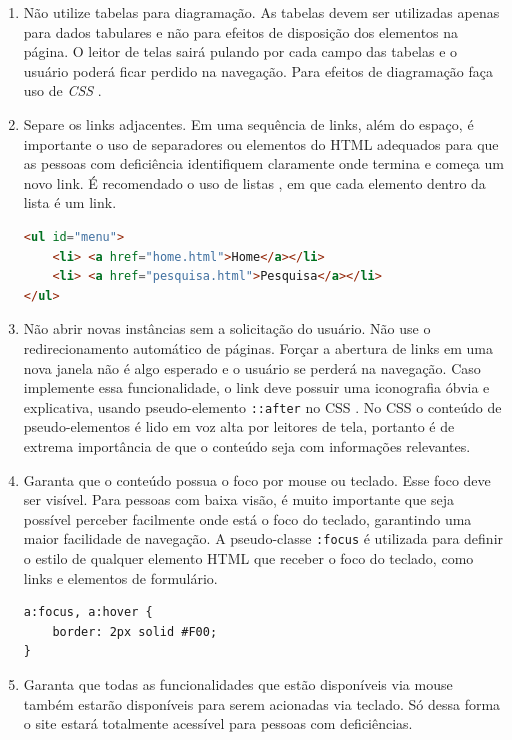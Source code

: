 {{{\begin{enumerate}
{\begin{lstlisting}[language=html,caption=usando landmarks]
<div role="heading" id="cabecalho"> 
  <h1>O Cabeçalho</h1> 
  <a href="#conteudo" accesskey="p">Pular para o conteúdo principals</a> 
</div> 
<div role="navigation" id="navegacao"> conteúdo da navegação </div>
<div role="main" id="conteudo"> conteúdo da main </mdiv>
\end{lstlisting}}
    \item Não utilize tabelas para diagramação. As tabelas devem ser utilizadas apenas para dados tabulares e não para efeitos de disposição dos elementos na página. O leitor de telas sairá pulando por cada campo das tabelas e o usuário poderá ficar perdido na navegação. Para efeitos de diagramação faça uso de \textit{CSS} \cite{CSS}.
    \item Separe os links adjacentes. Em uma sequência de links, além do espaço, é importante o uso de separadores ou elementos do HTML \cite{HTML} adequados para que as pessoas com deficiência identifiquem claramente onde termina e começa um novo link. É recomendado o uso de listas , em que cada elemento dentro da lista é um link.
{\begin{lstlisting}[language=html,caption=separando links adjacentes]
<ul id="menu">
    <li> <a href="home.html">Home</a></li>
    <li> <a href="pesquisa.html">Pesquisa</a></li>
</ul>
\end{lstlisting}}
    \item Não abrir novas instâncias sem a solicitação do usuário. Não use o redirecionamento automático de páginas. Forçar a abertura de links em uma nova janela não é algo esperado e o usuário se perderá na navegação. Caso implemente essa funcionalidade, o link deve possuir uma iconografia óbvia e explicativa, usando pseudo-elemento \lstinline{::after} no CSS \cite{CSS}. No CSS o conteúdo de pseudo-elementos é lido em voz alta por leitores de tela, portanto é de extrema importância de que o conteúdo seja com informações relevantes.
    \item Garanta que o conteúdo possua o foco por mouse ou teclado. Esse foco deve ser visível. Para pessoas com baixa visão, é muito importante que seja possível perceber facilmente onde está o foco do teclado, garantindo uma maior facilidade de navegação. A pseudo-classe \lstinline{:focus} é utilizada para definir o estilo de qualquer elemento HTML \cite{HTML} que receber o foco do teclado, como links e elementos de formulário.
{\begin{lstlisting}[language=html,caption=usando o foco visível]
a:focus, a:hover {
    border: 2px solid #F00;
}
\end{lstlisting}}
    \item Garanta que todas as funcionalidades que estão disponíveis via mouse também estarão disponíveis para serem acionadas via teclado. Só dessa forma o site estará totalmente acessível para pessoas com deficiências. 
\end{enumerate}
}
}
}

